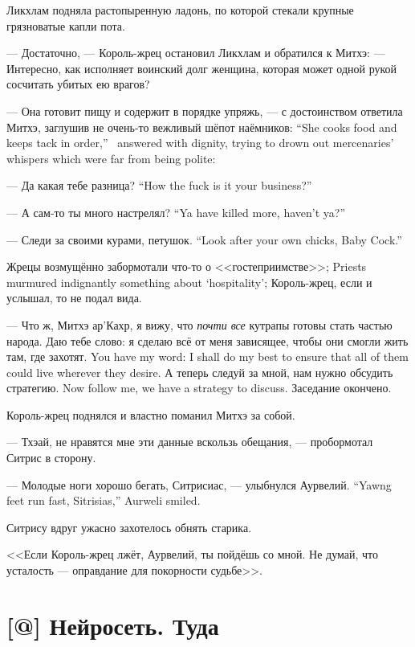Ликхлам подняла растопыренную ладонь, по которой стекали крупные грязноватые капли пота.

--- Достаточно, --- Король-жрец остановил Ликхлам и обратился к Митхэ:
--- Интересно, как исполняет воинский долг женщина, которая может одной рукой сосчитать убитых ею врагов?

{--- Она готовит пищу и содержит в порядке упряжь, --- с достоинством ответила Митхэ, заглушив не очень-то вежливый шёпот наёмников:}
{``She cooks food and keeps tack in order,'' \Mitchoe\ answered with dignity, trying to drown out mercenaries' whispers which were far from being polite:}

{--- Да какая тебе разница?}
{``How the fuck is it your business?''}

{--- А сам-то ты много настрелял?}
{``Ya have killed more, haven't ya?''}

{--- Следи за своими курами, петушок.}
{``Look after your own chicks, Baby Cock.''}

{Жрецы возмущённо забормотали что-то о <<гостеприимстве>>;}
{Priests murmured indignantly something about `hospitality';}
Король-жрец, если и услышал, то не подал вида.

--- Что ж, Митхэ ар'Кахр, я вижу, что \emph{почти все} кутрапы готовы стать частью народа.
{Даю тебе слово: я сделаю всё от меня зависящее, чтобы они смогли жить там, где захотят.}
{You have my word: I shall do my best to ensure that all of them could live wherever they desire.}
{А теперь следуй за мной, нам нужно обсудить стратегию.}
{Now follow me, we have a strategy to discuss.}
Заседание окончено.

Король-жрец поднялся и властно поманил Митхэ за собой.

--- Тхэай, не нравятся мне эти данные вскользь обещания, --- пробормотал Ситрис в сторону.

{--- Молодые ноги хорошо бегать, Ситрисиас, --- улыбнулся Аурвелий.}
{``Yawng feet run fast, Sitrisias,'' Aurweli smiled.}

Ситрису вдруг ужасно захотелось обнять старика.

<<Если Король-жрец лжёт, Аурвелий, ты пойдёшь со мной.
Не думай, что усталость --- оправдание для покорности судьбе>>.

\section{[@] Нейросеть. Туда}

